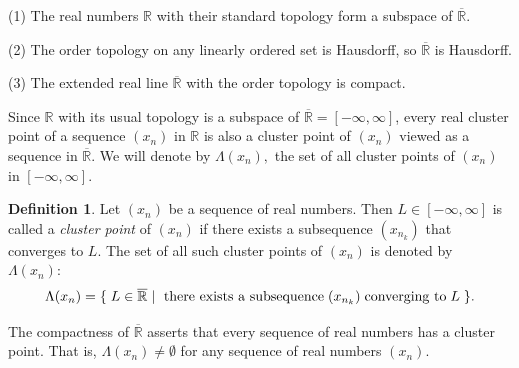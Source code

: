 \documentclass{amsart}
\theoremstyle{definition}
\newtheorem{definition}{Definition}
\theoremstyle{plain}
\begin{document}
\hspace{5mm} (1) The real numbers $\mathbb{R}$ with their standard topology form a subspace of $\overline{\mathbb R}.$ 


\hspace{5mm} (2) The order topology on any linearly ordered set is Hausdorff, so  $\overline{\mathbb{R}}$ is Hausdorff. 


\hspace{5mm} (3) The extended real line  $\overline{\mathbb{R}}$  with the order topology is compact. 
\par\medskip
Since $\mathbb{R}$ with its usual topology is a subspace of
$\overline{\mathbb{R}} = [-\infty,\infty]$, every real cluster point of a
sequence $(x_n)$ in $\mathbb{R}$ is also a cluster point of $(x_n)$ viewed
as a sequence in $\overline{\mathbb{R}}$. We will denote by
$\Lambda(x_n),$ the set of all cluster points of $(x_n)$ in
$[-\infty,\infty].$




\begin{definition} Let $(x_n)$ be a sequence of real numbers. Then $L \in [-\infty,\infty]$ is called a
\emph{cluster point} of $(x_n)$ if there exists a subsequence $(x_{n_k})$ 
that converges to $L$. The set of all such cluster points of $(x_n)$ is denoted by $\Lambda (x_n):$
 $$\Lambda(x_n) =\{\hspace{1mm} L \in \overline{\mathbb R} \hspace{1mm} | \hspace{1mm} \text{ there exists a subsequence} \hspace{1mm} (x_{n_k}) \hspace{1mm} \text{converging to} \hspace{1mm} L \hspace{1mm} \}.$$ 
\end{definition}
\par\medskip
\noindent The compactness of $\overline{\mathbb{R}}$ asserts that every sequence of real numbers has a cluster point. That is, 
$\Lambda(x_n) \neq \emptyset$ for any sequence of real numbers $(x_n)$. 


  
\end{document}
